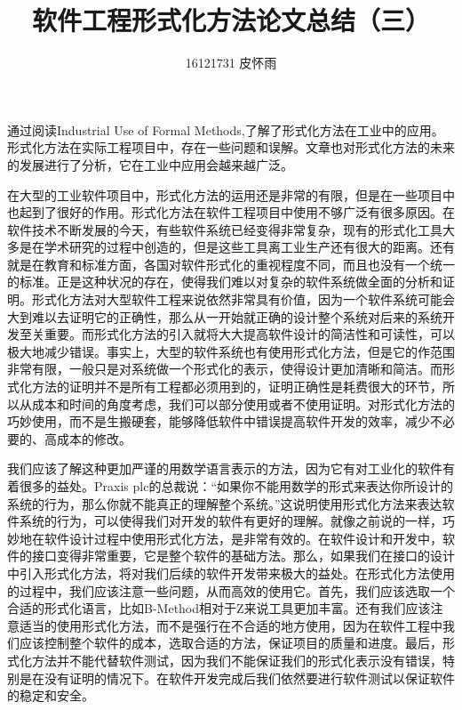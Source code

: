 \documentclass{article}
\author{16121731 皮怀雨}
\title{软件工程形式化方法论文总结（三）}
\begin{document}
\begin{CJK}{UTF8}{gbsn}
\maketitle
\begin{spacing}{1.4}
\renewcommand{\CJKglue}{\hskip 0.5pt}

通过阅读Industrial Use of Formal Methods,了解了形式化方法在工业中的应用。形式化方法在实际工程项目中，存在一些问题和误解。文章也对形式化方法的未来的发展进行了分析，它在工业中应用会越来越广泛。

在大型的工业软件项目中，形式化方法的运用还是非常的有限，但是在一些项目中也起到了很好的作用。形式化方法在软件工程项目中使用不够广泛有很多原因。在软件技术不断发展的今天，有些软件系统已经变得非常复杂，现有的形式化工具大多是在学术研究的过程中创造的，但是这些工具离工业生产还有很大的距离。还有就是在教育和标准方面，各国对软件形式化的重视程度不同，而且也没有一个统一的标准。正是这种状况的存在，使得我们难以对复杂的软件系统做全面的分析和证明。形式化方法对大型软件工程来说依然非常具有价值，因为一个软件系统可能会大到难以去证明它的正确性，那么从一开始就正确的设计整个系统对后来的系统开发至关重要。而形式化方法的引入就将大大提高软件设计的简洁性和可读性，可以极大地减少错误。事实上，大型的软件系统也有使用形式化方法，但是它的作范围非常有限，一般只是对系统做一个形式化的表示，使得设计更加清晰和简洁。而形式化方法的证明并不是所有工程都必须用到的，证明正确性是耗费很大的环节，所以从成本和时间的角度考虑，我们可以部分使用或者不使用证明。对形式化方法的巧妙使用，而不是生搬硬套，能够降低软件中错误提高软件开发的效率，减少不必要的、高成本的修改。

我们应该了解这种更加严谨的用数学语言表示的方法，因为它有对工业化的软件有着很多的益处。Praxis plc的总裁说：“如果你不能用数学的形式来表达你所设计的系统的行为，那么你就不能真正的理解整个系统。”这说明使用形式化方法来表达软件系统的行为，可以使得我们对开发的软件有更好的理解。就像之前说的一样，巧妙地在软件设计过程中使用形式化方法，是非常有效的。在软件设计和开发中，软件的接口变得非常重要，它是整个软件的基础方法。那么，如果我们在接口的设计中引入形式化方法，将对我们后续的软件开发带来极大的益处。在形式化方法使用的过程中，我们应该注意一些问题，从而高效的使用它。首先，我们应该选取一个合适的形式化语言，比如B-Method相对于Z来说工具更加丰富。还有我们应该注意适当的使用形式化方法，而不是强行在不合适的地方使用，因为在软件工程中我们应该控制整个软件的成本，选取合适的方法，保证项目的质量和进度。最后，形式化方法并不能代替软件测试，因为我们不能保证我们的形式化表示没有错误，特别是在没有证明的情况下。在软件开发完成后我们依然要进行软件测试以保证软件的稳定和安全。


\end{spacing}
\end{CJK}
\end{document}
